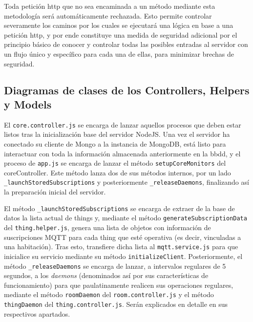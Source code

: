 Toda petición http que no sea encaminada a un método mediante esta metodología será automáticamente rechazada. Esto permite controlar severamente los caminos por los cuales se ejecutará una lógica en base a una petición http, y por ende constituye una medida de seguridad adicional por el principio básico de conocer y controlar todas las posibles entradas al servidor con un flujo único y específico para cada una de ellas, para minimizar brechas de seguridad.

\subsection{Diagramas de clases de los Controllers, Helpers y Models}
\label{makereference4.6.4}

El \verb|core.controller.js| se encarga de lanzar aquellos procesos que deben estar listos tras la inicialización base del servidor NodeJS. Una vez el servidor ha conectado su cliente de Mongo a la instancia de MongoDB, está listo para interactuar con toda la información almacenada anteriormente en la \gls{bbdd}, y el proceso de \verb|app.js| se encarga de lanzar el método \verb|setupCoreMonitors| del coreController. Este método lanza dos de sus métodos internos, por un lado \verb|_launchStoredSubscriptions| y posteriormente \verb|_releaseDaemons|, finalizando así la preparación inicial del servidor.

\vspace{0.5cm}

El método \verb|_launchStoredSubscriptions| se encarga de extraer de la base de datos la lista actual de things y, mediante el método \verb|generateSubscriptionData| del \verb|thing.helper.js|, genera una lista de objetos con información de suscripciones MQTT para cada thing que esté operativa (es decir, vinculadas a una habitación). Tras esto, transfiere dicha lista al \verb|mqtt.service.js| para que inicialice su servicio mediante su método \verb|initializeClient|.
Posteriormente, el método \verb|_releaseDaemons| se encarga de lanzar, a intervalos regulares de 5 segundos, a los \textit{daemons} (denominados así por sus características de funcionamiento) para que paulatinamente realicen sus operaciones regulares, mediante el método \verb|roomDaemon| del \verb|room.controller.js| y el método \verb|thingDaemon| del \verb|thing.controller.js|. Serán explicados en detalle en sus respectivos apartados.

\vspace{1cm}

